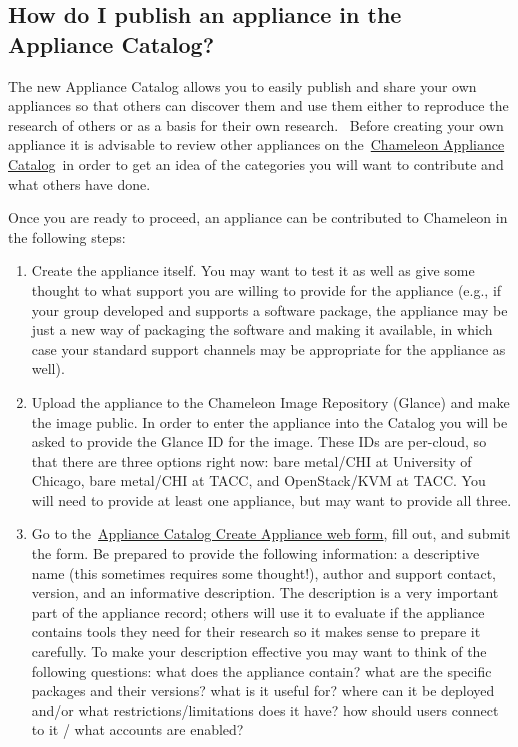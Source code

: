 \subsection{How do I publish an appliance in the Appliance Catalog?}\label{how-do-i-publish-an-appliance-in-the-chameleon-appliance-catalog}

The new Appliance Catalog allows you to easily publish and share your
own appliances so that others can discover them and use them either to
reproduce the research of others or as a basis for their own research.
~Before creating your own appliance it is advisable to review other
appliances on
the~\href{https://www.chameleoncloud.org/appliances/}{Chameleon
Appliance Catalog}~in order to get an idea of the categories you will
want to contribute and what others have done.~

Once you are ready to proceed, an appliance can be contributed to
Chameleon in the following steps:

\begin{enumerate}
\tightlist
\item
  Create the appliance itself. You may want to test it as well as give
  some thought to what support you are willing to provide for the
  appliance (e.g., if your group developed and supports a software
  package, the appliance may be just a new way of packaging the software
  and making it available, in which case your standard support channels
  may be appropriate for the appliance as well).
\item
  Upload the appliance to the Chameleon Image Repository (Glance) and
  make the image public. In order to enter the appliance into the
  Catalog you will be asked to provide the Glance ID for the image.
  These IDs are per-cloud, so that there are three options right now:
  bare metal/CHI at University of Chicago, bare metal/CHI at TACC, and
  OpenStack/KVM at TACC. You will need to provide at least one
  appliance, but may want to provide all three.
\item
  Go to
  the~\href{https://www.chameleoncloud.org/appliances/create/}{Appliance
  Catalog Create Appliance web form}, fill out, and submit the form. Be
  prepared to provide the following information: a descriptive name
  (this sometimes requires some thought!), author and support contact,
  version, and an informative description. The description is a very
  important part of the appliance record; others will use it to evaluate
  if the appliance contains tools they need for their research so it
  makes sense to prepare it carefully. To make your description
  effective you may want to think of the following questions: what does
  the appliance contain? what are the specific packages and their
  versions? what is it useful for? where can it be deployed and/or what
  restrictions/limitations does it have? how should users connect to it
  / what accounts are enabled?
\end{enumerate}

